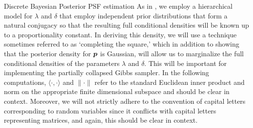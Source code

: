 \begin{chapter}{Discrete Bayesian Posterior PSF estimation}
As in \citep{bardsley2012mcmc}, we employ a hierarchical model for $\lambda$ and $\delta$ that employ independent prior distributions that form a natural conjugacy so that the resulting full conditional densities will be known up to a proportionality constant.
In deriving this density, we will use a technique sometimes referred to as `completing the square,' which in addition to showing that the posterior density for $\mbox{\boldmath$p$}$ is Gaussian, will allow us to marginalize the full conditional densities of the parameters $\lambda$ and $\delta$.
This will be important for implementing the partially collapsed Gibbs sampler.
In the following computations, $\langle \cdot, \cdot \rangle$ and $\|\cdot\|$ refer to the standard Euclidean inner product and norm on the appropriate finite dimensional subspace and should be clear in context.
Moreover, we will not strictly adhere to the convention of capital letters corresponding to random variables since it conflicts with capital letters representing matrices, and again, this should be clear in context.


\end{chapter}

